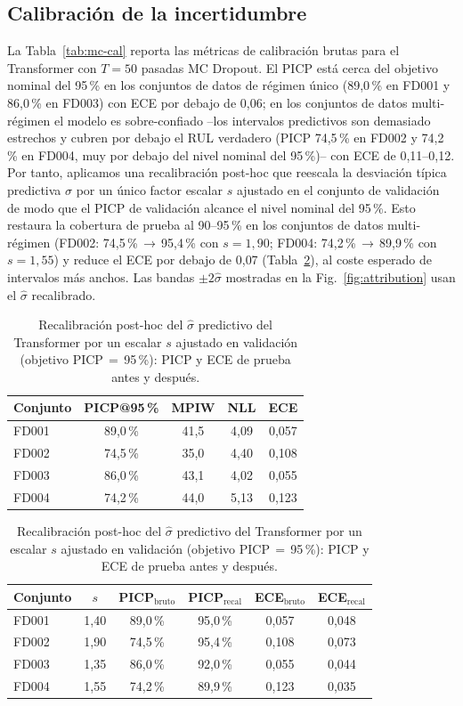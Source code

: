 \documentclass[5p,times,authoryear]{elsarticle}
\begin{document}
\subsection{Calibración de la incertidumbre}\label{sec:results-mc}

La Tabla~\ref{tab:mc-cal} reporta las métricas de calibración brutas para el Transformer con $T{=}50$ pasadas MC Dropout. El PICP está cerca del objetivo nominal del 95\,\% en los conjuntos de datos de régimen único (89{,}0\,\% en FD001 y 86{,}0\,\% en FD003) con ECE por debajo de 0{,}06; en los conjuntos de datos multi-régimen el modelo es sobre-confiado --los intervalos predictivos son demasiado estrechos y cubren por debajo el RUL verdadero (PICP 74{,}5\,\% en FD002 y 74{,}2\,\% en FD004, muy por debajo del nivel nominal del 95\,\%)-- con ECE de 0{,}11--0{,}12. Por tanto, aplicamos una recalibración post-hoc que reescala la desviación típica predictiva $\hat\sigma$ por un único factor escalar $s$ ajustado en el conjunto de validación de modo que el PICP de validación alcance el nivel nominal del 95\,\%. Esto restaura la cobertura de prueba al 90--95\,\% en los conjuntos de datos multi-régimen (FD002: 74{,}5\,\%\,$\rightarrow$\,95{,}4\,\% con $s{=}1{,}90$; FD004: 74{,}2\,\%\,$\rightarrow$\,89{,}9\,\% con $s{=}1{,}55$) y reduce el ECE por debajo de 0{,}07 (Tabla~\ref{tab:recal}), al coste esperado de intervalos más anchos. Las bandas $\pm 2\hat\sigma$ mostradas en la Fig.~\ref{fig:attribution} usan el $\hat\sigma$ recalibrado.

\begin{table}[!t]
\centering
\caption{Calibración MC Dropout del Transformer ($T{=}50$), bruta (antes de la recalibración).}
\label{tab:mc-cal}
\small
\begin{tabular}{lcccc}
\toprule
Conjunto & PICP@95\,\% & MPIW & NLL & ECE \\
\midrule
FD001 & 89,0\,\% & 41,5 & 4,09 & 0,057 \\
FD002 & 74,5\,\% & 35,0 & 4,40 & 0,108 \\
FD003 & 86,0\,\% & 43,1 & 4,02 & 0,055 \\
FD004 & 74,2\,\% & 44,0 & 5,13 & 0,123 \\
\bottomrule
\end{tabular}

\vspace{4pt}
\caption{Recalibración post-hoc del $\hat\sigma$ predictivo del Transformer por un escalar $s$ ajustado en validación (objetivo PICP\,$=$\,95\,\%): PICP y ECE de prueba antes y después.}
\label{tab:recal}
\small
\begin{tabular}{lccccc}
\toprule
Conjunto & $s$ & PICP$_{\mathrm{bruto}}$ & PICP$_{\mathrm{recal}}$ & ECE$_{\mathrm{bruto}}$ & ECE$_{\mathrm{recal}}$ \\
\midrule
FD001 & 1,40 & 89,0\,\% & 95,0\,\% & 0,057 & 0,048 \\
FD002 & 1,90 & 74,5\,\% & 95,4\,\% & 0,108 & 0,073 \\
FD003 & 1,35 & 86,0\,\% & 92,0\,\% & 0,055 & 0,044 \\
FD004 & 1,55 & 74,2\,\% & 89,9\,\% & 0,123 & 0,035 \\
\bottomrule
\end{tabular}
\end{table}
\end{document}
